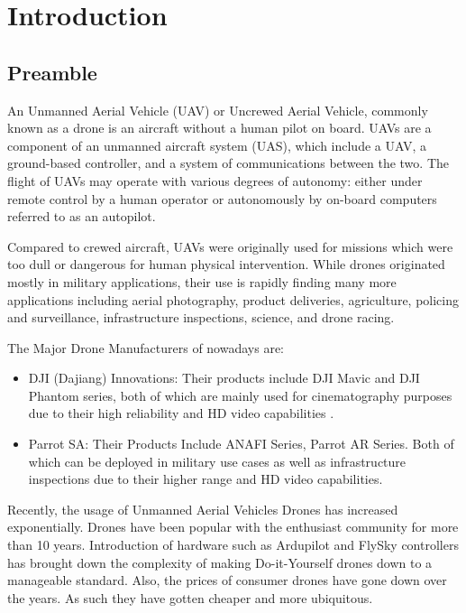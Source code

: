 \chapter{Introduction} \label{Introduction}
\section{Preamble} \label{Preamble}

\noindent An Unmanned Aerial Vehicle (UAV) or Uncrewed Aerial Vehicle, commonly known as a drone is an aircraft without a human pilot on board. UAVs are a component of an unmanned aircraft system (UAS), which include a UAV, a ground-based controller, and a system of communications between the two. The flight of UAVs may operate with various degrees of autonomy: either under remote control by a human operator or autonomously by on-board computers referred to as an autopilot.

\noindent Compared to crewed aircraft, UAVs were originally used for missions which were too dull or dangerous for human physical intervention. While drones originated mostly in military applications, their use is rapidly finding many more applications including aerial photography, product deliveries, agriculture, policing and surveillance, infrastructure inspections, science, and drone racing.

\noindent The Major Drone Manufacturers of nowadays are:
\begin{itemize}
\item DJI (Dajiang) Innovations: Their products include DJI Mavic and DJI Phantom series, both of which are mainly used for cinematography purposes due to their high reliability and HD video capabilities .
\item Parrot SA: Their Products Include ANAFI Series, Parrot AR Series. Both of which can be deployed in military use cases as well as infrastructure inspections due to their higher range and HD video capabilities.\end{itemize}

\noindent Recently, the usage of Unmanned Aerial Vehicles Drones has increased exponentially.
Drones have been popular with the enthusiast community for more than 10 years. Introduction of hardware such as Ardupilot and FlySky controllers has brought down the complexity of making Do-it-Yourself drones down to a manageable standard. Also, the prices of consumer drones have gone down over the years. As such they have gotten cheaper and more ubiquitous. 

